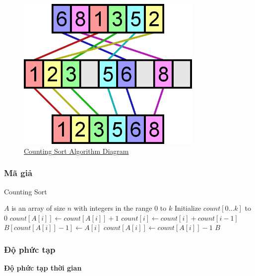 \begin{figure}[H]
    \centering
    \includegraphics[width=0.8\textwidth]{img/counting-sort.png}
    \caption{\href{https://www.growingwiththeweb.com/images/2014/05/25/counting-sort.svg}{Counting Sort Algorithm Diagram}}
\end{figure}

\subsubsection{Mã giả}
 
\begin{algorithm}[H]
\caption{Counting Sort}
\label{alg:counting-sort}
\begin{algorithmic}

\Require $A$ is an array of size $n$ with integers in the range $0$ to $k$
\State Initialize $count[0 \dots k]$ to $0$
    \State $count[A[i]] \gets count[A[i]] + 1$
\EndFor
{}
    \State $count[i] \gets count[i] + count[i-1]$
\EndFor
{}
    \State $B[count[A[i]]-1] \gets A[i]$
    \State $count[A[i]] \gets count[A[i]] - 1$
\EndFor
\State \Return $B$
\EndFunction

\end{algorithmic}
\end{algorithm}


\subsubsection{Độ phức tạp}
\textbf{Độ phức tạp thời gian}


